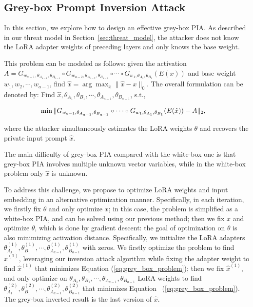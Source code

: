 
\subsection{Grey-box Prompt Inversion Attack}
In this section, we explore how to design an effective grey-box PIA. As described in our threat model in Section~\ref{sec:threat_model}, the attacker does not know the LoRA adapter weights of preceding layers and only knows the base weight.



This problem can be modeled as follows: given the activation $A=G_{w_{a-1},\theta_{A_{a-1}},\theta_{B_{a-1}}}\circ G_{w_{a-2},\theta_{A_{a-2}},\theta_{B_{a-2}}} \circ \cdots \circ G_{w_1,\theta_{A_1},\theta_{B_1}} (E(x))$ and base weight $w_1,w_2,\cdots,w_{a-1}$, find $\hat{x}=\arg\max_{\hat{x}} \|\hat{x}-x\|_0$. The overall formulation can be denoted by:
Find $\hat{x},\theta_{A_1},\theta_{B_1},\cdots,\theta_{A_{a-1}},\theta_{B_{a-1}}$, s.t.,
\begin{small}
    \begin{align}
\label{eq:grey_box_problem}
\hspace{-1em}
    \min \|G_{w_{a-1},\theta_{A_{a-1}},\theta_{B_{a-1}}} \circ \cdots \circ G_{w_1,\theta_{A_{1}},\theta_{B_{1}}} (E(\hat{x}))-A \|_2,
\end{align}
\end{small}
where the attacker simultaneously estimates the LoRA weights  $\theta$ and recovers the private input prompt $\hat{x}$.

The main difficulty of grey-box PIA compared with the white-box one is that grey-box PIA involves multiple unknown vector variables, while in the white-box problem only $\hat{x}$ is unknown. 

To address this challenge, we propose to optimize LoRA weights and input embedding in an alternative optimization manner. Specifically, in each iteration, we firstly fix $\theta$ and only optimize $x$; in this case, the problem is simplified as a white-box PIA, and can be solved using our previous method; then we fix $x$ and optimize $\theta$, which is done by gradient descent: the goal of optimization on $\theta$ is also minimizing activation distance. Specifically, we initialize the LoRA adapters $\theta_{A_1}^{(1)},\theta_{B_1}^{(1)},\cdots,\theta_{A_{a-1}}^{(1)},\theta_{B_{a-1}}^{(1)}$ with zeros. We firstly optimize the problem to find $\hat{x}^{(1)}$, leveraging our inversion attack algorithm while fixing the adapter weight to find $\hat{x}^{(1)}$ that minimizes Equation (\ref{eq:grey_box_problem}); then we fix $\hat{x}^{(1)}$, and only optimize on $\theta_{A_1},\theta_{B_1},\cdots,\theta_{A_{a-1}},\theta_{B_{a-1}}$ LoRA weights to find $\theta_{A_1}^{(2)},\theta_{B_1}^{(2)},\cdots,\theta_{A_{a-1}}^{(2)},\theta_{B_{a-1}}^{(2)}$ that minimizes Equation  ~(\ref{eq:grey_box_problem}). The grey-box inverted result is the last version of $\hat{x}$.  %

